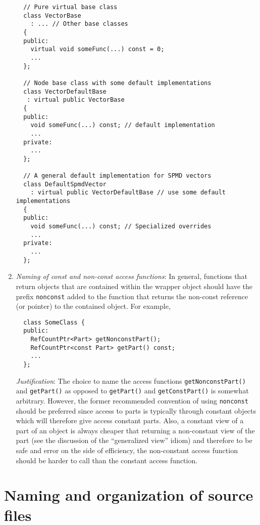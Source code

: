 \begin{enumerate}
{\small\begin{verbatim}
  // Pure virtual base class 
  class VectorBase
    : ... // Other base classes
  {
  public:
    virtual void someFunc(...) const = 0;
    ...
  };

  // Node base class with some default implementations
  class VectorDefaultBase
   : virtual public VectorBase
  {
  public:
    void someFunc(...) const; // default implementation
    ...
  private:
    ...
  };

  // A general default implementation for SPMD vectors
  class DefaultSpmdVector
    : virtual public VectorDefaultBase // use some default implementations
  {
  public:
    void someFunc(...) const; // Specialized overrides
    ...
  private:
    ...
  };
\end{verbatim}}

{}\item\textit{Naming of const and non-const access functions}: In general,
functions that return objects that are contained within the wrapper object
should have the prefix {}\texttt{nonconst} added to the function that returns
the non-const reference (or pointer) to the contained object.  For example,

{\small\begin{verbatim}
  class SomeClass {
  public:
    RefCountPtr<Part> getNonconstPart();
    RefCountPtr<const Part> getPart() const;
    ...
  };
\end{verbatim}}

{}\textit{Justification}: The choice to name the access functions
{}\texttt{getNonconstPart()} and {}\texttt{getPart()} as opposed to
{}\texttt{getPart()} and {}\texttt{getConstPart()} is somewhat arbitrary.
However, the former recommended convention of using {}\texttt{nonconst} should
be preferred since access to parts is typically through constant objects which
will therefore give access constant parts.  Also, a constant view of a part of
an object is always cheaper that returning a non-constant view of the part
(see the discussion of the ``generalized view'' idiom) and therefore to be
safe and error on the side of efficiency, the non-constant access function
should be harder to call than the constant access function.

\end{enumerate}

%
\section{Naming and organization of source files}
%

